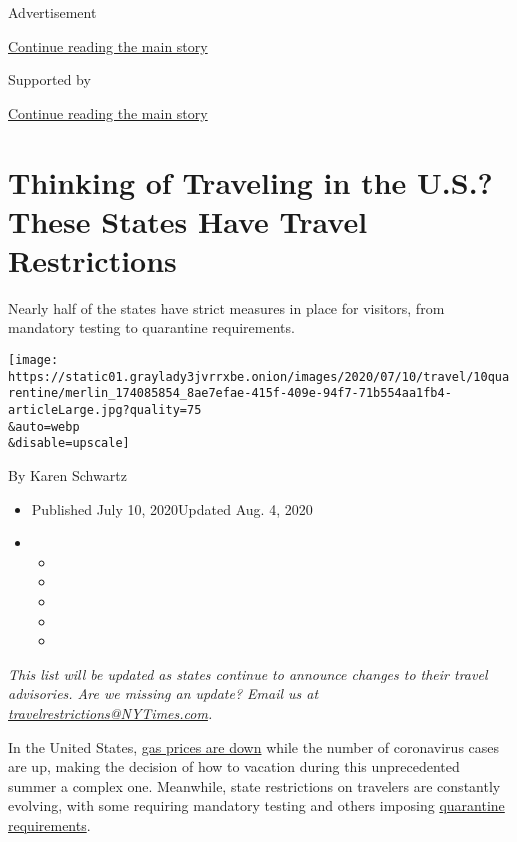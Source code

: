 Advertisement

\protect\hyperlink{after-top}{Continue reading the main story}

Supported by

\protect\hyperlink{after-sponsor}{Continue reading the main story}

\hypertarget{thinking-of-traveling-in-the-us-these-states-have-travel-restrictions}{%
\section{Thinking of Traveling in the U.S.? These States Have Travel
Restrictions}\label{thinking-of-traveling-in-the-us-these-states-have-travel-restrictions}}

Nearly half of the states have strict measures in place for visitors,
from mandatory testing to quarantine requirements.

\texttt{[image: https://static01.graylady3jvrrxbe.onion/images/2020/07/10/travel/10quarentine/merlin\_174085854\_8ae7efae-415f-409e-94f7-71b554aa1fb4-articleLarge.jpg?quality=75\\\&auto=webp\\\&disable=upscale]}

By Karen Schwartz

\begin{itemize}
\item
  Published July 10, 2020Updated Aug. 4, 2020
\item
  \begin{itemize}
  \item
  \item
  \item
  \item
  \item
  \end{itemize}
\end{itemize}

\emph{This list will be updated as states continue to announce changes
to their travel advisories. Are we missing an update? Email us at}
\href{mailto:travelrestrictions@NYTimes.com}{\emph{travelrestrictions@NYTimes.com}}\emph{.}

In the United States,
\href{https://gasprices.aaa.com/national-average-decreases-as-gas-demand-remains-low/}{gas
prices are down} while the number of coronavirus cases are up, making
the decision of how to vacation during this unprecedented summer a
complex one. Meanwhile, state restrictions on travelers are constantly
evolving, with some requiring mandatory testing and others imposing
\href{https://www.cdc.gov/quarantine/index.html}{quarantine
requirements}.

